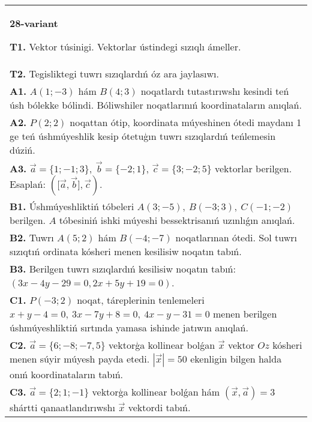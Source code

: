 \documentclass{article}
\begin{document}
\begin{tabular}{m{17cm}}
\textbf{28-variant}

\textbf{T1.} 
Vektor túsinigi. Vektorlar ústindegi sızıqlı ámeller.
 \\
\textbf{T2.} 
Tegisliktegi tuwrı sızıqlardıń óz ara jaylasıwı.
 \\
\textbf{A1.} 
$A (1;-3) $ hám $B (4;3) $ noqatlardı tutastırıwshı
kesindi teń úsh bólekke bólindi. Bóliwshiler noqatlarınıń koordinataların
anıqlań.
 \\
\textbf{A2.} 
$P (2;2) $ noqattan ótip, koordinata múyeshinen ótedi
maydanı 1 ge teń úshmúyeshlik kesip ótetuģın tuwrı sızıqlardıń
teńlemesin dúziń.
 \\
\textbf{A3.} 
$\overrightarrow{a}
= \{ 1; - 1;3\}, \ \overrightarrow{b} = \{ - 2;1\}$, $\overrightarrow{c} = \{3; -2;5\}$ vektorlar berilgen. Esaplań:
$ (\lbrack\overrightarrow{a},\overrightarrow{b}\rbrack,\overrightarrow{c}) $.
 \\
\textbf{B1.} 
Úshmúyeshliktiń tóbeleri
\(A (3;-5),\ B (-3;3),\ C (-1;-2) \) berilgen. $A$ tóbesiniń ishki
múyeshi bessektrisanıń uzınlıǵın anıqlań.
 \\
\textbf{B2.} 
Tuwrı \(A (5;2) \) hám \(B (-4; -7) \) noqatlarınan ótedi.
Sol tuwrı sızıqtıń ordinata kósheri menen kesilisiw noqatın tabıń.
 \\
\textbf{B3.} 
Berilgen tuwrı sızıqlardıń kesilisiw noqatın tabıń:
$(3x-4y-29=0, 2x+5y+19=0) $.
 \\
\textbf{C1.} 
\(P (−3;2) \) noqat, táreplerinin tenlemeleri
\(x+y-4=0,\ 3x-7y+8=0,\ 4x-y-31=0\) menen
berilgen úshmúyeshliktiń sırtında yamasa ishinde jatıwın anıqlań.
 \\
\textbf{C2.} 
$\vec{a} = \{ 6; - 8; - 7,5\}$ vektorģa kollinear bolǵan $\vec{x}$ vektor $Oz$ kósheri menen súyir múyesh payda etedi. $|\vec{x}| = 50$ ekenligin bilgen halda onıń koordinataların tabıń.
 \\
\textbf{C3.} 
$\vec{a} = \{ 2;1; - 1\}$ vektorģa kollinear bolǵan hám $\left(\vec{x},\vec{a} \right) = 3$ shártti qanaatlandırıwshı $\vec{x}$ vektordi tabıń.
 \\

\end{tabular}
\vspace{1cm}
\end{document}
